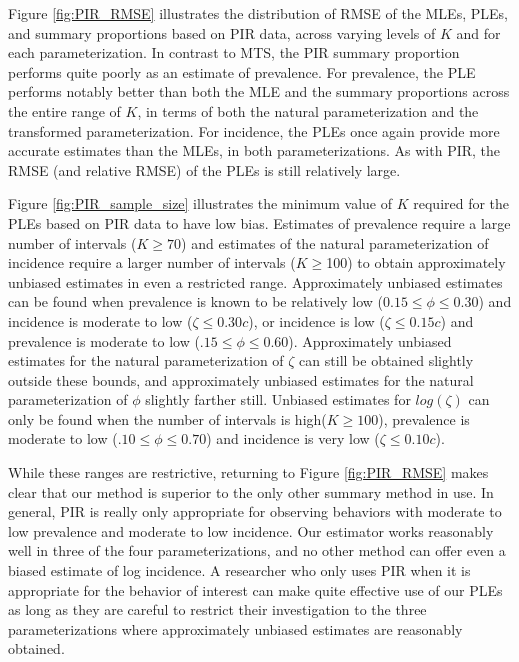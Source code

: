 \documentclass[man, noextraspace, floatsintext]{apa6}\usepackage[]{graphicx}\usepackage[]{color}
\begin{document}
Figure \ref{fig:PIR_RMSE} illustrates the distribution of RMSE of the MLEs, PLEs, and summary proportions based on PIR data, across varying levels of $K$ and for each parameterization. 
In contrast to MTS, the PIR summary proportion performs quite poorly as an estimate of prevalence. 
For prevalence, the PLE performs notably better than both the MLE and the summary proportions across the entire range of $K$, in terms of both the natural parameterization and the transformed parameterization. 
For incidence, the PLEs once again provide more accurate estimates than the MLEs, in both parameterizations. As with PIR, the RMSE (and relative RMSE) of the PLEs is still relatively large.

Figure \ref{fig:PIR_sample_size} illustrates the minimum value of $K$ required for the PLEs based on PIR data to have low bias. Estimates of prevalence require a large number of intervals ($K \geq 70$) and estimates of the natural parameterization of incidence require a larger number of intervals ($K \geq $100) to obtain approximately unbiased estimates in even a restricted range. Approximately unbiased estimates can be found when prevalence is known to be relatively low ($0.15 \leq \phi \leq 0.30$) and incidence is moderate to low ($\zeta \leq 0.30c$), or incidence is low ($\zeta \leq 0.15c$) and prevalence is moderate to low ($.15 \leq \phi \leq 0.60$). Approximately unbiased estimates for the natural parameterization of $\zeta$ can still be obtained slightly outside these bounds, and approximately unbiased estimates for the natural parameterization of $\phi$ slightly farther still. Unbiased estimates for $log(\zeta)$ can only be found when the number of intervals is high($K \geq 100$), prevalence is moderate to low ($.10 \leq \phi \leq 0.70$) and incidence is very low ($\zeta \leq 0.10c$).

While these ranges are restrictive, returning to Figure \ref{fig:PIR_RMSE} makes clear that our method is superior to the only other summary method in use. In general, PIR is really only appropriate for observing behaviors with moderate to low prevalence and moderate to low incidence. Our estimator works reasonably well in three of the four parameterizations, and no other method can offer even a biased estimate of log incidence. A researcher who only uses PIR when it is appropriate for the behavior of interest can make quite effective use of our PLEs as long as they are careful to restrict their investigation to the three parameterizations where approximately unbiased estimates are reasonably obtained.
\end{document}
